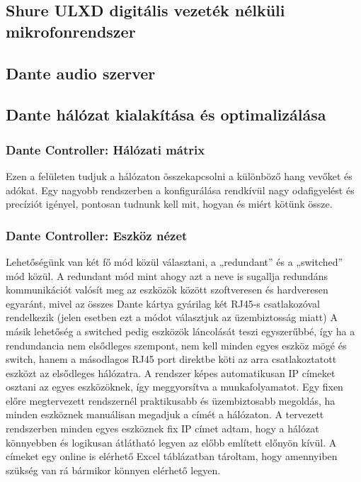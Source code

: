 \subsection{Shure ULXD digitális vezeték nélküli mikrofonrendszer}



\subsection{Dante audio szerver}



\subsection{Dante hálózat kialakítása és optimalizálása}

\subsubsection{Dante Controller: Hálózati mátrix}

Ezen a felületen tudjuk a hálózaton összekapcsolni a különböző hang vevőket és
adókat. Egy nagyobb rendszerben a konfigurálása rendkívül nagy odafigyelést és
precíziót igényel, pontosan tudnunk kell mit, hogyan és miért kötünk össze.

\subsubsection{Dante Controller: Eszköz nézet}

Lehetőségünk van két fő mód közül választani, a „redundant'' és a
„switched'' mód közül. A redundant mód mint ahogy azt a neve is sugallja
redundáns kommunikációt valósít meg az eszközök között szoftveresen és
hardveresen egyaránt, mivel az összes Dante kártya gyárilag két RJ45-s
csatlakozóval rendelkezik (jelen esetben ezt a módot választjuk az
üzembiztosság miatt) 
A másik lehetőség a switched pedig eszközök láncolását
teszi egyszerűbbé, így ha a rendundancia nem elsődleges szempont, nem kell
minden egyes eszköz mögé és switch, hanem a másodlagos RJ45 port direktbe köti
az arra csatlakoztatott eszközt az elsődleges hálózatra. A rendszer képes
automatikusan IP címeket osztani az egyes eszközöknek, így meggyorsítva a
munkafolyamatot. Egy fixen előre megtervezett rendszernél praktikusabb és
üzembiztosabb megoldás, ha minden eszköznek manuálisan megadjuk a címét a
hálózaton. A tervezett rendszerben minden egyes eszköznek fix IP címet adtam,
hogy a hálózat könnyebben és logikusan átlátható legyen az előbb említett előnyön kívül.
A címeket egy online is elérhető Excel táblázatban tároltam, hogy amennyiben szükség van rá
bármikor könnyen elérhető legyen.


